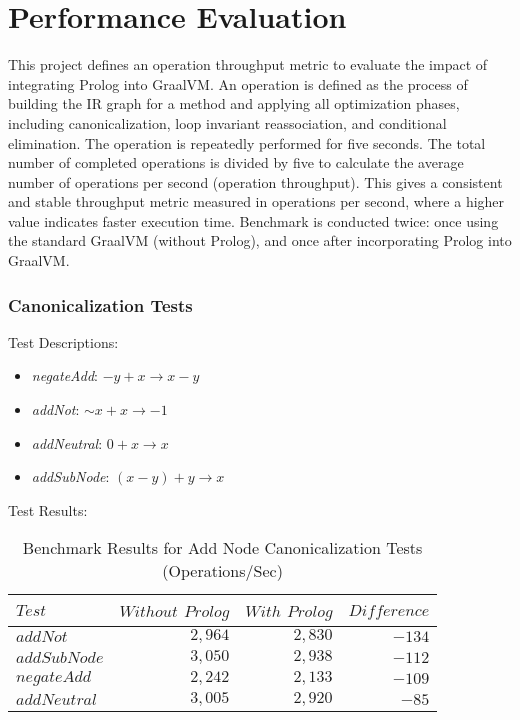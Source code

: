 \renewcommand{\arraystretch}{1.3} %
\setlength{\tabcolsep}{10pt}      %

\chapter[Performance Evaluation]{Performance Evaluation}
This project defines an operation throughput metric to evaluate the impact of integrating Prolog into GraalVM. An operation is defined as the process of building the IR graph for a method and applying all optimization phases, including canonicalization, loop invariant reassociation, and conditional elimination. The operation is repeatedly performed for five seconds. The total number of completed operations is divided by five to calculate the average number of operations per second (operation throughput). This gives a consistent and stable throughput metric measured in operations per second, where a higher value indicates faster execution time. Benchmark is conducted twice: once using the standard GraalVM (without Prolog), and once after incorporating Prolog into GraalVM.
\subsection*{Canonicalization Tests}

Test Descriptions:
\begin{itemize}
    \item \textit{negateAdd}: $-y + x \rightarrow x - y$
    \item \textit{addNot}: $\sim x + x \rightarrow -1$
    \item \textit{addNeutral}: $0 + x \rightarrow x$
    \item \textit{addSubNode}: $(x - y) + y \rightarrow x$
\end{itemize}

Test Results:
\begin{table}[h]
    \centering
    \begin{tabular}{|l|r|r|r|}
        \hline
        $Test$ & $Without$ $Prolog$ & $With$ $Prolog$ & $Difference$ \\
        \hline
        $addNot$      & $2,964$ & $2,830$ & $-134$ \\
        $addSubNode$  & $3,050$ & $2,938$ & $-112$ \\
        $negateAdd$   & $2,242$ & $2,133$ & $-109$ \\
        $addNeutral$  & $3,005$ & $2,920$ & $-85$ \\
        \hline
    \end{tabular}
    \caption{Benchmark Results for Add Node Canonicalization Tests (Operations/Sec)}
    \label{table:Canonicalization}
\end{table}

